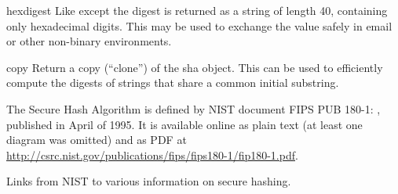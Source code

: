 \begin{methoddesc}[sha]{hexdigest}{}
Like  except the digest is returned as a string of
length 40, containing only hexadecimal digits.  This may 
be used to exchange the value safely in email or other non-binary
environments.
\end{methoddesc}

\begin{methoddesc}[sha]{copy}{}
Return a copy (``clone'') of the sha object.  This can be used to
efficiently compute the digests of strings that share a common initial
substring.
\end{methoddesc}

\begin{seealso}
    {The Secure Hash Algorithm is defined by NIST document FIPS
     PUB 180-1:
     , published in April of 1995.  It is
     available online as plain text (at least one diagram was
     omitted) and as PDF at
     \url{http://csrc.nist.gov/publications/fips/fips180-1/fip180-1.pdf}.}

           {Links from NIST to various information on secure hashing.}
\end{seealso}
